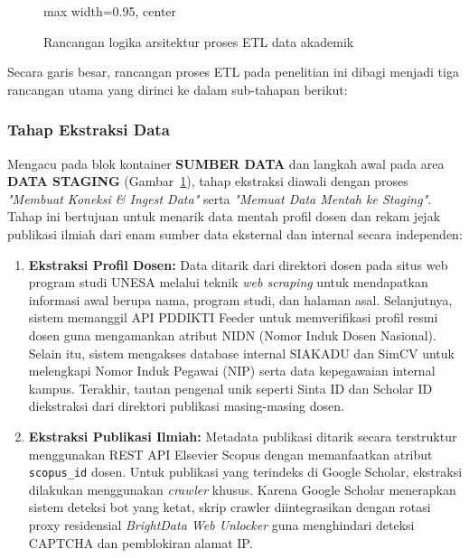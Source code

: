 \documentclass{rapidsart}
\theoremstyle{plain}
\theoremstyle{remark}
\theoremstyle{definition}
\begin{document}
\begin{sloppypar}
\begin{figure}[htbp]
\begin{adjustbox}{max width=0.95\textwidth, center}
        \end{adjustbox}
        \caption{Rancangan logika arsitektur proses ETL data akademik}
        \label{fig:rancangan-logika-etl}
    \end{figure}

    Secara garis besar, rancangan proses ETL pada penelitian ini dibagi menjadi tiga rancangan utama yang dirinci ke dalam sub-tahapan berikut:

    \subsubsection{Tahap Ekstraksi Data}
    Mengacu pada blok kontainer \textbf{SUMBER DATA} dan langkah awal pada area \textbf{DATA STAGING} (Gambar~\ref{fig:rancangan-logika-etl}), tahap ekstraksi diawali dengan proses \textit{"Membuat Koneksi \& Ingest Data"} serta \textit{"Memuat Data Mentah ke Staging"}. Tahap ini bertujuan untuk menarik data mentah profil dosen dan rekam jejak publikasi ilmiah dari enam sumber data eksternal dan internal secara independen:
    \begin{enumerate}
        \item \textbf{Ekstraksi Profil Dosen:} Data ditarik dari direktori dosen pada situs web program studi UNESA melalui teknik \textit{web scraping} untuk mendapatkan informasi awal berupa nama, program studi, dan halaman asal. Selanjutnya, sistem memanggil API PDDIKTI Feeder \citep{setiawan2022pddikti} untuk memverifikasi profil resmi dosen guna mengamankan atribut NIDN (Nomor Induk Dosen Nasional). Selain itu, sistem mengakses database internal SIAKADU dan SimCV untuk melengkapi Nomor Induk Pegawai (NIP) serta data kepegawaian internal kampus. Terakhir, tautan pengenal unik seperti Sinta ID dan Scholar ID diekstraksi dari direktori publikasi masing-masing dosen.
        \item \textbf{Ekstraksi Publikasi Ilmiah:} Metadata publikasi ditarik secara terstruktur menggunakan REST API Elsevier Scopus dengan memanfaatkan atribut \texttt{scopus\_id} dosen. Untuk publikasi yang terindeks di Google Scholar, ekstraksi dilakukan menggunakan \textit{crawler} khusus. Karena Google Scholar menerapkan sistem deteksi bot yang ketat, skrip crawler diintegrasikan dengan rotasi proxy residensial \textit{BrightData Web Unlocker} guna menghindari deteksi CAPTCHA dan pemblokiran alamat IP.

\end{enumerate}
\end{sloppypar}
\end{document}
